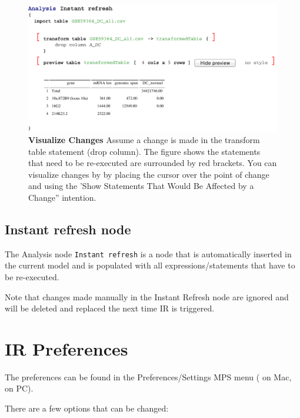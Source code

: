 \begin{figure}[h!tbp]
  \centering
  \includegraphics[width=\figWidthWide]{figures/IRChangedStatements.pdf}
\caption[Visualize Changes]{\textbf{Visualize Changes} Assume a change is made in the transform table statement (drop column). The figure shows the statements that need to be re-executed are surrounded by red brackets. You can visualize changes by by placing the cursor over the point of change and using the 'Show Statements That Would Be Affected by a Change'' intention.}
\end{figure}

\subsection{Instant refresh node}
The Analysis node \texttt{Instant refresh} is a node that is automatically inserted in the current model and is populated with all expressions/statements
that have to be re-executed. 

\begin{remark}
Note that changes made manually in the Instant Refresh node are ignored and will be deleted and replaced the next time IR is triggered.
\end{remark}


\section{IR Preferences}\label{sec:IRPreferences}
The preferences can be found in the Preferences/Settings MPS menu ( on Mac, \allowbreak
{}  on PC). 

There are a few options that can be changed:

